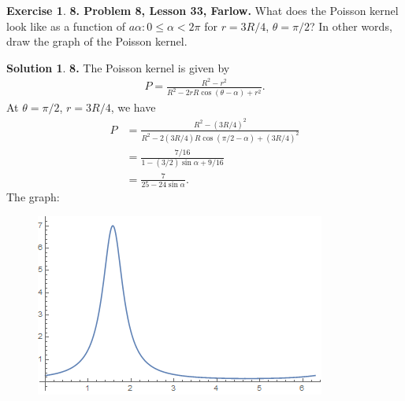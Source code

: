 \documentclass{article}
\theoremstyle{definition}
\newtheorem*{exer*}{Exercise}
\newtheorem*{sln*}{Solution}
\newcommand{\f}[2]{\frac{#1}{#2}}
\begin{document}
\begin{exer*}\textbf{8. Problem 8, Lesson 33, Farlow.} What does the Poisson kernel look like as a function of $a\alpha: 0 \leq \alpha < 2\pi$ for
	$r = 3R/4$, $\theta = \pi/2$? In other words, draw the graph of the Poisson kernel.
	
	\begin{sln*}\textbf{8.} The Poisson kernel is given by
		\begin{align*}
		P = \frac{R^2 - r^2}{R^2 - 2rR\cos(\theta - \alpha) + r^2}.
		\end{align*}
		At $\theta = \pi/2$, $r = 3R/4$, we have
		\begin{align*}
		P &= \frac{R^2 - (3R/4)^2}{R^2 - 2(3R/4)R\cos(\pi/2 - \alpha) + (3R/4)^2}\\
		&= \frac{7/16}{1 - (3/2)\sin\alpha + 9/16}\\
		&= \f{7}{25 - 24\sin\alpha}.
		\end{align*}
		The graph:
		\begin{figure}[h!]
			\centering
			\includegraphics[scale=0.5]{kernel.png}
		\end{figure}
		
	\end{sln*}
	
\end{exer*}



\newpage
\end{document}
